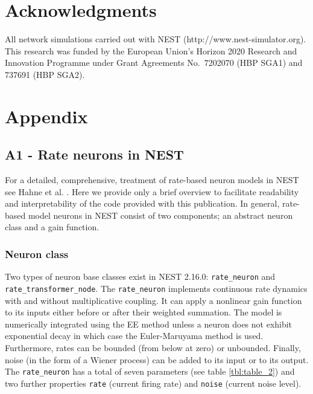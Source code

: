 \documentclass[10pt,a4paper,onecolumn]{article}
\begin{document}
\hypertarget{acknowledgments}{%
\section{Acknowledgments}\label{acknowledgments}}

All network simulations carried out with NEST
(http://www.nest-simulator.org). This research was funded by the
European Union's Horizon 2020 Research and Innovation Programme under
Grant Agreements No.~7202070 (HBP SGA1) and 737691 (HBP SGA2).

\hypertarget{appendix}{%
\section{Appendix}\label{appendix}}

\hypertarget{a1---rate-neurons-in-nest}{%
\subsection{A1 - Rate neurons in NEST}\label{a1---rate-neurons-in-nest}}

For a detailed, comprehensive, treatment of rate-based neuron models in
NEST see Hahne et al. \autocite{Hahne2017}. Here we provide only a brief
overview to facilitate readability and interpretability of the code
provided with this publication. In general, rate-based model neurons in
NEST consist of two components; an abstract neuron class and a gain
function.

\hypertarget{neuron-class}{%
\subsubsection{Neuron class}\label{neuron-class}}

Two types of neuron base classes exist in NEST 2.16.0:
\texttt{rate\_neuron} and\\
\texttt{rate\_transformer\_node}. The \texttt{rate\_neuron} implements
continuous rate dynamics with and without multiplicative coupling. It
can apply a nonlinear gain function to its inputs either before or after
their weighted summation. The model is numerically integrated using the
EE method unless a neuron does not exhibit exponential decay in which
case the Euler-Maruyama method is used. Furthermore, rates can be
bounded (from below at zero) or unbounded. Finally, noise (in the form
of a Wiener process) can be added to its input or to its output. The
\texttt{rate\_neuron} has a total of seven parameters (see table
\ref{tbl:table_2}) and two further properties \texttt{rate} (current
firing rate) and \texttt{noise} (current noise level).
\end{document}
